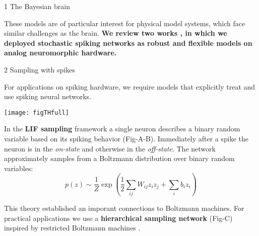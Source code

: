 \begin{frame}
\begin{columns}
\begin{column}{0.99\textwidth}
\begin{columns}[t]
\begin{column}{0.32\textwidth}
\begin{block}{\large 1 The Bayesian brain}
					\begin{adjustwidth}{1cm}{1cm}
					
					These models are of particular interest for physical model systems, which face similar challenges as the brain.
					\textbf{We review two works \cite{dold2019stochasticity,kungl2019accelerated}, in which we deployed stochastic spiking networks as robust and flexible models on  analog neuromorphic hardware.}

					\end{adjustwidth}

					\blockSpaceOne
					\end{block}


					\interBlockSpaceOne



					\begin{block}{\large 2 Sampling with spikes}
					\blockSpaceOne

					\begin{adjustwidth}{1.cm}{1.cm}
					\justifying
					For applications on spiking hardware, we require models that explicitly treat and use spiking neural networks.

					\thirdBlockImSpace					\begin{center}
						\texttt{[image: figTHfull]}
					\end{center}
					\thirdBlockImSpace

					In the \textbf{LIF sampling} framework \cite{petrovici2016stochastic} a single neuron describes a binary random variable based on its spiking behavior (Fig-A-B).
					Immediately after a spike the neuron is in the \emph{on-state} and otherwise in the \emph{off-state}.
					The network approximately samples from a Boltzmann distribution over binary random variables:
					\thirdBlockImSpace
					\begin{equation}
					p(z) \sim \frac{1}{Z} \exp \left ( \frac{1}{2} \sum_{ij} W_{ij} z_i z_j + \sum_{i} b_i z_i  \right)
					\end{equation}
					\thirdBlockImSpace
					\end{adjustwidth}
					This theory established an imporant connections to Boltzmann machines.
					For practical applications we use a \textbf{hierarchical sampling network} (Fig-C) inspired by restricted Boltzmann machines \cite{hinton1984boltzmann}.



					\blockSpaceOne
					\end{block}



\end{column}
\end{columns}
\end{column}
\end{columns}
\end{frame}
